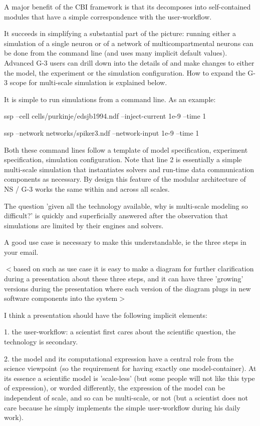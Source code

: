 \documentclass[12pt]{article}
\begin{document}
A major benefit of the CBI framework is that its decomposes into
self-contained modules that have a simple correspondence with the
user-workflow.

It succeeds in simplifying a substantial part of the picture: running
either a simulation of a single neuron or of a network of
multicompartmental neurons can be done from the command line (and uses
many implicit default values).  Advanced G-3 users can drill down into
the details of and make changes to either the model, the experiment or
the simulation configuration.  How to expand the G-3 scope for
multi-scale simulation is explained below.

It is simple to run simulations from a command line.  As an example:

ssp --cell cells/purkinje/edsjb1994.ndf --inject-current 1e-9 --time 1

ssp --network networks/spiker3.ndf --network-input 1e-9 --time 1

Both these command lines follow a template of model specification,
experiment specification, simulation configuration.  Note that line 2
is essentially a simple multi-scale simulation that instantiates
solvers and run-time data communication components as necessary.  By
design this feature of the modular architecture of NS / G-3 works the
same within and across all scales.

The question 'given all the technology available, why is multi-scale
modeling so difficult?' is quickly and superficially answered after
the observation that simulations are limited by their engines and
solvers.

A good use case is necessary to make this understandable, ie the three
steps in your email.

$<$based on such as use case it is easy to make a diagram for further
clarification during a presentation about these three steps, and it
can have three 'growing' versions during the presentation where each
version of the diagram plugs in new software components into the
system$>$

I think a presentation should have the following implicit elements:

1. the user-workflow: a scientist first cares about the scientific
question, the technology is secondary.

2. the model and its computational expression have a central role from
the science viewpoint (so the requirement for having exactly one
model-container).  At its essence a scientific model is 'scale-less'
(but some people will not like this type of expression), or worded
differently, the expression of the model can be independent of scale,
and so can be multi-scale, or not (but a scientist does not care
because he simply implements the simple user-workflow during his daily
work).
\end{document}
